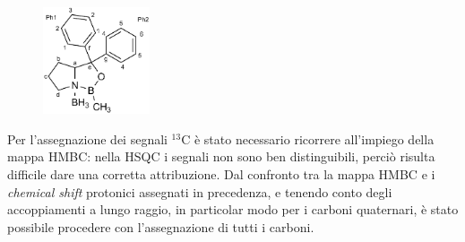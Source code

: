 \documentclass[a4paper, italian, oneside, 12pt]{article}
\begin{document}
\begin{figure}\vspace{-30pt}
  \begin{center}
    \includegraphics[width=0.28\textwidth]{img/AOB3.png}
  \end{center}\vspace{-27pt}
\end{figure}

Per l'assegnazione dei segnali $^{13}$C è stato necessario ricorrere all'impiego della mappa HMBC: nella HSQC i segnali non sono ben distinguibili, perciò risulta difficile dare una corretta attribuzione. Dal confronto tra la mappa HMBC e i {\emph{chemical shift}} protonici assegnati in precedenza, e tenendo conto degli accoppiamenti a lungo raggio, in particolar modo per i carboni quaternari, è stato possibile procedere con l'assegnazione di tutti i carboni. 
\end{document}
